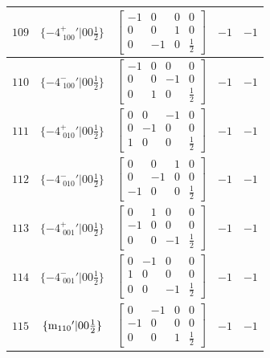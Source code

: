 \documentclass[fleqn,8pt]{jsarticle}
\begin{document}
\begin{longtable}{ccccc}
$ 109 $ & $ \{-4^{+}_{\,\,100}{}'|0 0 \frac{1}{2}\} $ & $ \begin{bmatrix} -1 & 0 & 0 & 0 \\ 0 & 0 & 1 & 0 \\ 0 & -1 & 0 & \frac{1}{2} \end{bmatrix} $ & $ -1 $ & $ -1 $ \\ \hline
$ 110 $ & $ \{-4^{-}_{\,\,100}{}'|0 0 \frac{1}{2}\} $ & $ \begin{bmatrix} -1 & 0 & 0 & 0 \\ 0 & 0 & -1 & 0 \\ 0 & 1 & 0 & \frac{1}{2} \end{bmatrix} $ & $ -1 $ & $ -1 $ \\ \hline
$ 111 $ & $ \{-4^{+}_{\,\,010}{}'|0 0 \frac{1}{2}\} $ & $ \begin{bmatrix} 0 & 0 & -1 & 0 \\ 0 & -1 & 0 & 0 \\ 1 & 0 & 0 & \frac{1}{2} \end{bmatrix} $ & $ -1 $ & $ -1 $ \\ \hline
$ 112 $ & $ \{-4^{-}_{\,\,010}{}'|0 0 \frac{1}{2}\} $ & $ \begin{bmatrix} 0 & 0 & 1 & 0 \\ 0 & -1 & 0 & 0 \\ -1 & 0 & 0 & \frac{1}{2} \end{bmatrix} $ & $ -1 $ & $ -1 $ \\ \hline
$ 113 $ & $ \{-4^{+}_{\,\,001}{}'|0 0 \frac{1}{2}\} $ & $ \begin{bmatrix} 0 & 1 & 0 & 0 \\ -1 & 0 & 0 & 0 \\ 0 & 0 & -1 & \frac{1}{2} \end{bmatrix} $ & $ -1 $ & $ -1 $ \\ \hline
$ 114 $ & $ \{-4^{-}_{\,\,001}{}'|0 0 \frac{1}{2}\} $ & $ \begin{bmatrix} 0 & -1 & 0 & 0 \\ 1 & 0 & 0 & 0 \\ 0 & 0 & -1 & \frac{1}{2} \end{bmatrix} $ & $ -1 $ & $ -1 $ \\ \hline
$ 115 $ & $ \{{\rm m}_{110}{}'|0 0 \frac{1}{2}\} $ & $ \begin{bmatrix} 0 & -1 & 0 & 0 \\ -1 & 0 & 0 & 0 \\ 0 & 0 & 1 & \frac{1}{2} \end{bmatrix} $ & $ -1 $ & $ -1 $ \\ \hline

\end{longtable}
\end{document}
